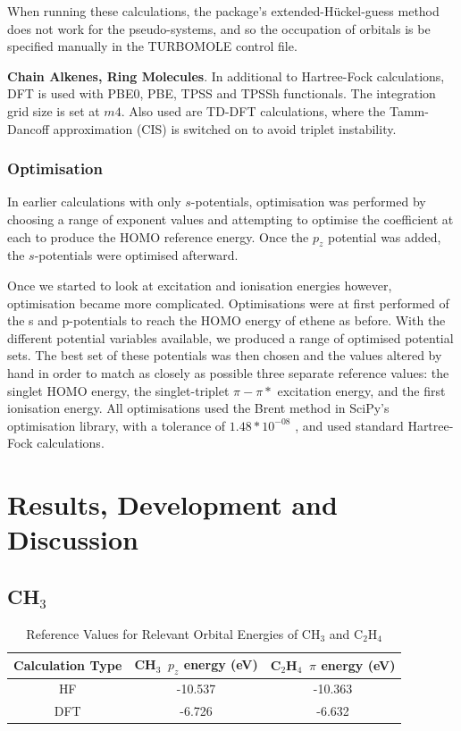 \documentclass[journal=jctcce,manuscript=article]{achemso}
\begin{document}
When running these calculations, the package's extended-H\"uckel-guess method does not work for the pseudo-systems, and so the occupation of orbitals is be specified manually in the TURBOMOLE control file.

\textbf{Chain Alkenes, Ring Molecules}. In additional to Hartree-Fock calculations, DFT is used with PBE0, PBE, TPSS and TPSSh functionals. \cite{pbe0}\cite{pbe}\cite{tpss}\cite{tpssh} The integration grid size is set at \(m4\). Also used are TD-DFT calculations, where the Tamm-Dancoff approximation (CIS) \cite{tammdancoff} is switched on to avoid triplet instability.

\subsubsection{Optimisation}

In earlier calculations with only \(s\)-potentials, optimisation was performed by choosing a range of exponent values and attempting to optimise the coefficient at each to produce the HOMO reference energy. Once the \(p_{z}\) potential was added, the \(s\)-potentials were optimised afterward. 

Once we started to look at excitation and ionisation energies however, optimisation became more complicated. Optimisations were at first performed of the s and p-potentials to reach the HOMO energy of ethene as before. With the different potential variables available, we produced a range of optimised potential sets. The best set of these potentials was then chosen and the values altered by hand in order to match as closely as possible three separate reference values: the singlet HOMO energy, the singlet-triplet \(\pi-\pi*\) excitation energy, and the first ionisation energy. All optimisations used the Brent method in SciPy's optimisation library, with a tolerance of \(1.48*10^{-08}\) \cite{scipy}, and used standard Hartree-Fock calculations.

\section{Results, Development and Discussion}
\subsection{CH\(_{3}\)}

\begin{table}[ht]
\caption{Reference Values for Relevant Orbital Energies of CH\(_{3}\) and C\(_{2}\)H\(_{4}\)} 
\centering
\begin{tabular}{c c c}
\hline\hline
Calculation Type & CH\(_{3}\)\, \(p_{z}\) energy (eV) & C\(_{2}\)H\(_{4}\)\, \(\pi\) energy (eV) \\
\hline
HF & -10.537 & -10.363 \\
DFT & -6.726 & -6.632 \\
\hline
\end{tabular}
\label{table:ref_values_1}
\end{table}
\end{document}
